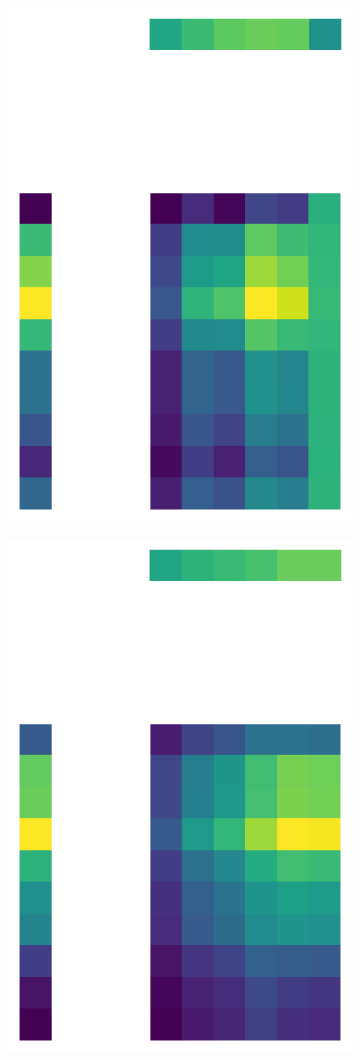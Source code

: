 \documentclass[10pt,twocolumn]{article}
\begin{document}
\begin{figure}[H]
\begin{subfigure}[t]{.15\textwidth}
\includegraphics[scale=.2]{semi-structured-matrix-reconstruction-PCs-1.png}
\caption{ }
\end{subfigure}
\begin{subfigure}[t]{.15\textwidth}
\centering
\includegraphics[scale=.2]{structured-matrix-reconstruction-PCs-1.png}

\end{subfigure}
\end{figure}
\end{document}
